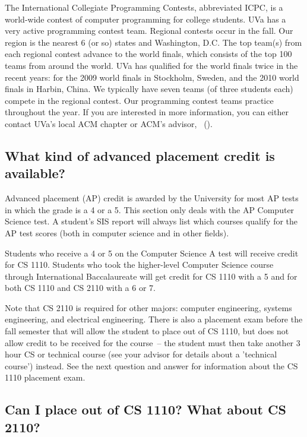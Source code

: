 The International Collegiate Programming Contests, abbreviated ICPC,
is a world-wide contest of computer programming for college
students. UVa has a very active programming contest team. Regional
contests occur in the fall.  Our region is the nearest 6 (or so)
states and Washington, D.C. The top team(s) from each regional contest
advance to the world finals, which consists of the top 100 teams from
around the world. UVa has qualified for the world finals twice in the
recent years: for the 2009 world finals in Stockholm, Sweden, and the
2010 world finals in Harbin, China. We typically have seven teams (of
three students each) compete in the regional contest. Our programming
contest teams practice throughout the year. If you are interested in
more information, you can either contact UVa's local ACM
chapter or ACM's advisor,
\acmadvisor\ (\acmadvisoremail).

\subsection{What kind of advanced placement credit is available?}
\label{applacement}

Advanced placement (AP) credit is awarded by the University for most
AP tests in which the grade is a 4 or a 5. This section only deals
with the AP Computer Science test. A student's SIS report will
always list which courses qualify for the AP test scores (both in
computer science and in other fields).

Students who receive a 4 or 5 on the Computer Science A test will
receive credit for CS 1110.  Students who took the higher-level Computer
Science course through International Baccalaureate will get credit for
CS 1110 with a 5 and for both CS 1110 and CS 2110 with a 6 or 7.

Note that CS 2110 is required for other majors: computer engineering,
systems engineering, and electrical engineering. There is also a
placement exam before the fall semester that will allow the student to
place out of CS 1110, but does not allow credit to be received for the
course~-- the student must then take another 3 hour CS or technical
course (see your advisor for details about a 'technical course')
instead. See the next question and answer for information about the CS
1110 placement exam.

\subsection{Can I place out of CS 1110? What about CS 2110?}
\label{101placement}

